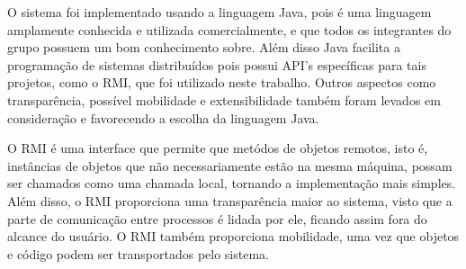 \documentclass[../main.tex]{subfiles}
\begin{document}
O sistema foi implementado usando a linguagem Java, pois é uma linguagem amplamente conhecida e utilizada comercialmente, e que todos os integrantes do grupo possuem um bom conhecimento sobre. Além disso Java facilita a programação de sistemas distribuídos pois possui API's específicas para tais projetos, como o RMI, que foi utilizado neste trabalho. Outros aspectos como transparência, possível mobilidade e extensibilidade também foram levados em consideração e favorecendo a escolha da linguagem Java.

O RMI é uma interface que permite que metódos de objetos remotos, isto é, instâncias de objetos que não necessariamente estão na mesma máquina, possam ser chamados como uma chamada local, tornando a implementação mais simples. Além disso, o RMI proporciona uma transparência maior ao sistema, visto que a parte de comunicação entre processos é lidada por ele, ficando assim fora do alcance do usuário. O RMI também proporciona mobilidade, uma vez que objetos e código podem ser transportados pelo sistema.
\end{document}
